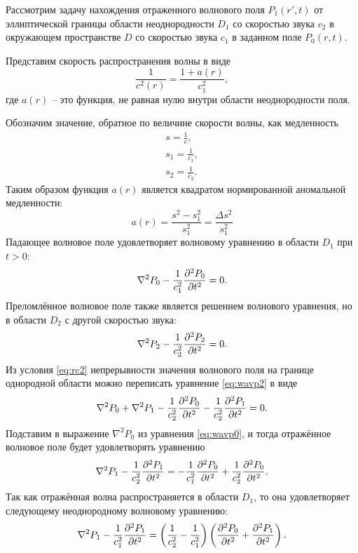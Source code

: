 \documentclass[a4paper, fontsize=14pt]{article}
\begin{document}
	Рассмотрим задачу нахождения отраженного волнового поля $P_1(r',t)$ от эллиптической границы области неоднородности $D_1$ со скоростью звука  $c_2$ в окружающем пространстве $D$ со скоростью звука $c_1$ в заданном поле $P_0(r,t)$. 
	
	
	Представим скорость распространения волны в виде
	\begin{equation}
		\frac{1}{c^2(r)} = \frac{1+a(r)}{c_1^2},
	\end{equation}
	где $a(r)$ -- это функция, не равная нулю внутри области неоднородности поля.
	  
	Обозначим значение, обратное по величине скорости волны, как медленность 
	\begin{gather*}
		s = \frac{1}{c}, \\
		s_1 = \frac{1}{c_1}, \\
		s_2 = \frac{1}{c_2}.
	\end{gather*}
	Таким образом функция $a(r)$ является квадратом нормированной аномальной медленности:
	$$
	a(r) = \frac{s^2 - s_1^2}{s_1^2} = \frac{\Delta s^2}{s_1^2}
	$$
	Падающее волновое поле удовлетворяет волновому уравнению в области $D_1$ при $t>0$:
	\begin{equation}
		\nabla^2 P_0 - \frac{1}{c_1^2}\diff[2]{P_0}{t} = 0.
		\label{eq:wavp0}
	\end{equation}
	Преломлённое волновое поле также является решением волнового уравнения, но в области $D_2$ с другой скоростью звука:
	\begin{equation}
		\nabla^2 P_2 - \frac{1}{c_2^2}\diff[2]{P_2}{t} = 0.
		\label{eq:wavp2}
	\end{equation}
	Из условия \eqref{eq:rc2} непрерывности значения  волнового поля на границе однородной области можно переписать уравнение \eqref{eq:wavp2} в виде
	\begin{equation}
		\nabla^2 P_0 + \nabla^2 P_1 - \frac{1}{c_2^2}\diff[2]{P_0}{t} - \frac{1}{c_2^2}\diff[2]{P_1}{t}  = 0.
		\label{eq:wavp01sum}
	\end{equation}
	Подставим в выражение $\nabla^2 P_0$ из уравнения \eqref{eq:wavp0}, и
	тогда отражённое волновое поле будет удовлетворять уравнению \cite{bleistein2012mathematical}
	\begin{equation}
		\nabla^2 P_1 - \frac{1}{c_2^2}\diff[2]{P_1}{t}  = - \frac{1}{c_1^2}\diff[2]{P_0}{t} + \frac{1}{c_2^2}\diff[2]{P_0}{t}.
	\end{equation}
	Так как отражённая волна распространяется в области $D_1$, то она удовлетворяет следующему неоднородному волновому уравнению:
	\begin{equation}
		\nabla^2 P_1 - \frac{1}{c_1^2}\diff[2]{P_1}{t}  = \left(\frac{1}{c_2^2} - \frac{1}{c_1^2}\right)\left(\diff[2]{P_0}{t} + \diff[2]{P_1}{t}\right).
		\label{eq:wavp1inh}
	\end{equation}
\end{document}
